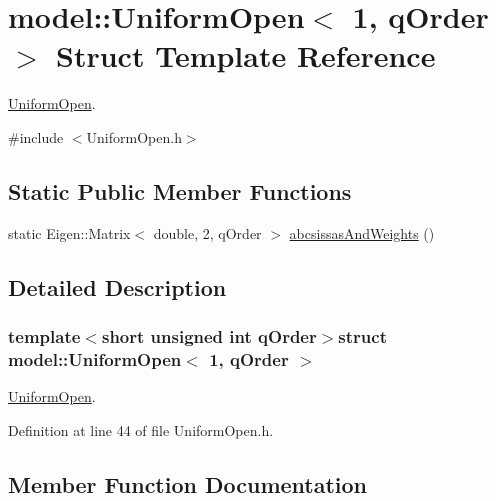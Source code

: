\hypertarget{structmodel_1_1_uniform_open_3_011_00_01q_order_01_4}{}\section{model\+:\+:Uniform\+Open$<$ 1, q\+Order $>$ Struct Template Reference}
\label{structmodel_1_1_uniform_open_3_011_00_01q_order_01_4}


\hyperlink{structmodel_1_1_uniform_open}{Uniform\+Open}.  




{\ttfamily \#include $<$Uniform\+Open.\+h$>$}

\subsection*{Static Public Member Functions}
\begin{DoxyCompactItemize}
\item 
static Eigen\+::\+Matrix$<$ double, 2, q\+Order $>$ \hyperlink{structmodel_1_1_uniform_open_3_011_00_01q_order_01_4_a6c75e84a658ee8f1278d8291d6c53110}{abcsissas\+And\+Weights} ()
\end{DoxyCompactItemize}


\subsection{Detailed Description}
\subsubsection*{template$<$short unsigned int q\+Order$>$struct model\+::\+Uniform\+Open$<$ 1, q\+Order $>$}

\hyperlink{structmodel_1_1_uniform_open}{Uniform\+Open}. 



Definition at line 44 of file Uniform\+Open.\+h.



\subsection{Member Function Documentation}
\hypertarget{structmodel_1_1_uniform_open_3_011_00_01q_order_01_4_a6c75e84a658ee8f1278d8291d6c53110}{}
